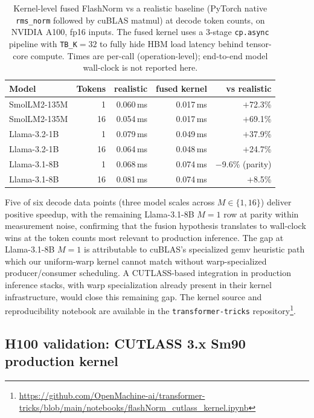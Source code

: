 \documentclass{article}
\begin{document}
\begin{table}[h!] \centering
\caption{Kernel-level fused FlashNorm vs a realistic baseline (PyTorch native \texttt{rms\_norm} followed by cuBLAS matmul) at decode token counts, on NVIDIA A100, fp16 inputs. The fused kernel uses a 3-stage \texttt{cp.async} pipeline with \texttt{TB\_K}$=32$ to fully hide HBM load latency behind tensor-core compute. Times are per-call (operation-level); end-to-end model wall-clock is not reported here.}
\label{tab:a100-decode-wins}
\begin{tabular}{l r r r r}
\hline
Model & Tokens & realistic & fused kernel & vs realistic \\
\hline
SmolLM2-135M & 1   & 0.060\,ms & 0.017\,ms & $+$72.3\% \\
SmolLM2-135M & 16  & 0.054\,ms & 0.017\,ms & $+$69.1\% \\
Llama-3.2-1B & 1   & 0.079\,ms & 0.049\,ms & $+$37.9\% \\
Llama-3.2-1B & 16  & 0.064\,ms & 0.048\,ms & $+$24.7\% \\
Llama-3.1-8B & 1   & 0.068\,ms & 0.074\,ms & $-$9.6\% (parity) \\
Llama-3.1-8B & 16  & 0.081\,ms & 0.074\,ms & $+$8.5\% \\
\hline
\end{tabular}
\end{table}

Five of six decode data points (three model scales across $M \in \{1, 16\}$) deliver positive speedup, with the remaining Llama-3.1-8B $M{=}1$ row at parity within measurement noise, confirming that the fusion hypothesis translates to wall-clock wins at the token counts most relevant to production inference. The gap at Llama-3.1-8B $M{=}1$ is attributable to cuBLAS's specialized gemv heuristic path which our uniform-warp kernel cannot match without warp-specialized producer/consumer scheduling. A CUTLASS-based integration in production inference stacks, with warp specialization already present in their kernel infrastructure, would close this remaining gap.
The kernel source and reproducibility notebook are available in the \texttt{transformer-tricks} repository\footnote{\url{https://github.com/OpenMachine-ai/transformer-tricks/blob/main/notebooks/flashNorm\_cutlass\_kernel.ipynb}}.

\subsection{H100 validation: CUTLASS 3.x Sm90 production kernel}\label{app:h100-cutlass}
\end{document}
